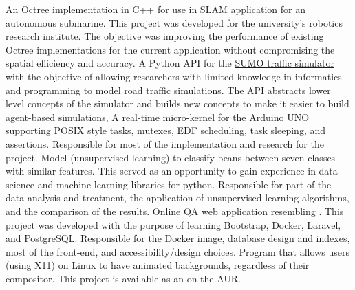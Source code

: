 \documentclass[letterpaper]{twentysecondcv} %
\begin{document}
\begin{twenty}
    {}
    {An Octree implementation in C++ for use in SLAM application for an autonomous
    submarine. This project was developed for the university's robotics research
    institute. The objective was improving the performance of existing Octree
    implementations for the current application without compromising the
    spatial efficiency and accuracy.}
    {}
    {A Python API for the \href{https://www.eclipse.org/sumo/}{SUMO traffic simulator} with the
    objective of allowing researchers with limited knowledge in informatics and programming to
    model road traffic simulations. The API abstracts lower level concepts of the simulator and
    builds new concepts to make it easier to build agent-based simulations,}
    {}
    {A real-time micro-kernel for the Arduino UNO supporting POSIX style tasks, mutexes,
    EDF scheduling, task sleeping, and assertions. Responsible for most of the implementation
    and research for the project.}
    {}
    {Model (unsupervised learning) to classify beans between seven classes with similar
    features. This served as an opportunity to gain experience in data science and machine
    learning libraries for python. Responsible for part of the data analysis and treatment,
    the application of unsupervised learning algorithms, and the comparison of the results.}
    {}
    {Online QA web application resembling .
    This project was developed with the purpose of learning Bootstrap, Docker, Laravel,
    and PostgreSQL. Responsible for the Docker image, database design and indexes,
    most of the front-end, and accessibility/design choices.}
    {}
    {Program that allows users (using X11) on Linux to have animated backgrounds,
    regardless of their compositor. This project is available as an
    on the AUR.}
\end{twenty}
\end{document}
